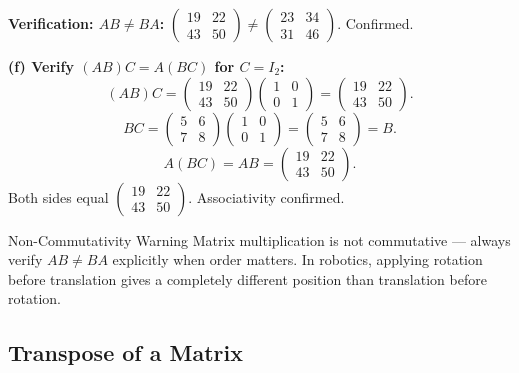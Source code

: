 \documentclass[12pt,a4paper]{article}
\begin{document}
\textbf{Verification: $AB \neq BA$:} $\begin{pmatrix} 19 & 22 \\ 43 & 50 \end{pmatrix} \neq \begin{pmatrix} 23 & 34 \\ 31 & 46 \end{pmatrix}$. Confirmed.

\textbf{(f) Verify $(AB)C = A(BC)$ for $C = I_2$:}
\[
(AB)C = \begin{pmatrix} 19 & 22 \\ 43 & 50 \end{pmatrix}\begin{pmatrix} 1 & 0 \\ 0 & 1 \end{pmatrix} = \begin{pmatrix} 19 & 22 \\ 43 & 50 \end{pmatrix}.
\]
\[
BC = \begin{pmatrix} 5 & 6 \\ 7 & 8 \end{pmatrix}\begin{pmatrix} 1 & 0 \\ 0 & 1 \end{pmatrix} = \begin{pmatrix} 5 & 6 \\ 7 & 8 \end{pmatrix} = B.
\]
\[
A(BC) = AB = \begin{pmatrix} 19 & 22 \\ 43 & 50 \end{pmatrix}.
\]
Both sides equal $\begin{pmatrix} 19 & 22 \\ 43 & 50 \end{pmatrix}$. Associativity confirmed.

\begin{learnbox}{Non-Commutativity Warning}
Matrix multiplication is not commutative --- always verify $AB \neq BA$ explicitly when order matters. In robotics, applying rotation before translation gives a completely different position than translation before rotation.
\end{learnbox}

\subsection{Transpose of a Matrix}
\end{document}
